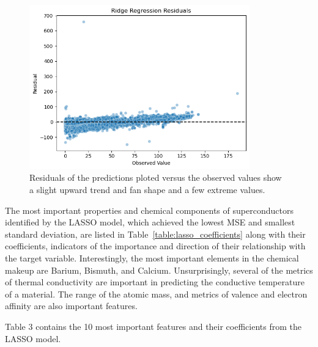 \documentclass{article}      %
\begin{document}
\begin{figure}[h]
        \centering
        \includegraphics[width=0.85\textwidth]{figures/plt_residuals_L2.png}
        \caption{Residuals of the predictions ploted versus the observed values show a slight upward trend and fan shape and a few extreme values.}
\label{fig:residL2}
\end{figure}

The most important properties and chemical components of superconductors identified by the LASSO model, which achieved the lowest MSE and smallest standard deviation, are listed in Table~\ref{table:lasso_coefficients} along with their coefficients, indicators of the importance and direction of their relationship with the target variable. Interestingly, the most important elements in the chemical makeup are Barium, Bismuth, and Calcium. Unsurprisingly, several of the metrics of thermal conductivity are important in predicting the conductive temperature of a material. The range of the atomic mass, and metrics of valence and electron affinity are also important features.

\FloatBarrier
Table 3 contains the 10 most important features and their coefficients from the LASSO model.
\end{document}
